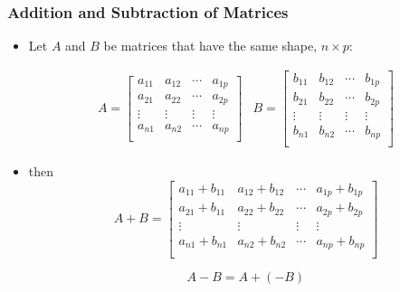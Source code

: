\documentclass{beamer}
\begin{document}


\begin{frame}
  \frametitle{Addition and Subtraction of Matrices}

\begin{itemize}
	\item Let $A$ and $B$ be matrices that have the same shape, $n \times p$:

\[
\begin{array}{cc}
A = \left[ \begin{array}{cccc}

a_{11} & a_{12} & \cdots & a_{1p} \\
a_{21} & a_{22} & \cdots & a_{2p} \\
\vdots & \vdots & \vdots & \vdots \\
a_{n1} & a_{n2} & \cdots & a_{np} \\

\end{array}
\right]

&	

B = \left[ \begin{array}{cccc}

b_{11} & b_{12} & \cdots & b_{1p} \\
b_{21} & b_{22} & \cdots & b_{2p} \\
\vdots & \vdots & \vdots & \vdots \\
b_{n1} & b_{n2} & \cdots & b_{np} \\

\end{array}
\right]
\end{array}
\]	

	
\item then
\[
A + B = \left[ \begin{array}{cccc}
a_{11} + b_{11} & a_{12} + b_{12} & \cdots & a_{1p} + b_{1p} \\
a_{21} + b_{11}& a_{22} + b_{22} & \cdots & a_{2p} + b_{2p}\\
\vdots & \vdots & \vdots & \vdots \\
a_{n1} + b_{n1}& a_{n2} + b_{n2} & \cdots & a_{np} + b_{np}\\
\end{array}
\right]
\]

\[
A - B = A + (-B)
\]

\end{itemize}

\end{frame}
\end{document}
